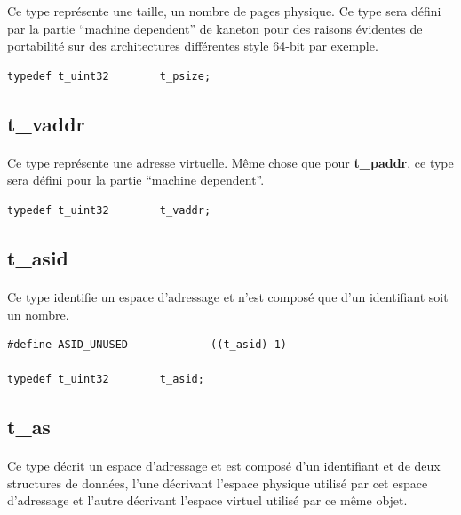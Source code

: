 \documentclass[10pt,a4wide]{article}
\begin{document}
Ce type repr\'esente une taille, un nombre de pages physique. Ce type
sera d\'efini par la partie ``machine dependent'' de kaneton pour des
raisons \'evidentes de portabilit\'e sur des architectures diff\'erentes
style 64-bit par exemple.

\begin{verbatim}
typedef t_uint32        t_psize;
\end{verbatim}

\subsection{t\_vaddr}

\paragraph{}

Ce type repr\'esente une adresse virtuelle. M\^eme chose que pour
\textbf{t\_paddr}, ce type sera d\'efini pour la partie ``machine dependent''.

\begin{verbatim}
typedef t_uint32        t_vaddr;
\end{verbatim}

\subsection{t\_asid}

\paragraph{}

Ce type identifie un espace d'adressage et n'est compos\'e que
d'un identifiant soit un nombre.

\begin{verbatim}
#define ASID_UNUSED             ((t_asid)-1)

typedef t_uint32        t_asid;
\end{verbatim}

\subsection{t\_as}

\paragraph{}

Ce type d\'ecrit un espace d'adressage et est compos\'e d'un identifiant et
de deux structures de donn\'ees, l'une d\'ecrivant l'espace physique utilis\'e
par cet espace d'adressage et l'autre d\'ecrivant l'espace virtuel utilis\'e
par ce m\^eme objet.
\end{document}
